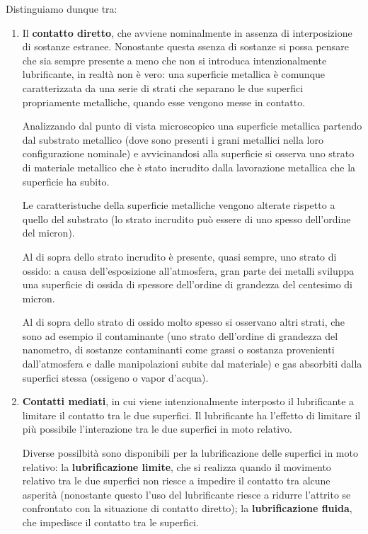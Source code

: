 Distinguiamo dunque tra:
\begin{enumerate}
\item Il \textbf{contatto diretto}, che avviene nominalmente in assenza di interposizione di sostanze estranee. Nonostante questa ssenza di sostanze si possa pensare che sia sempre presente a meno che non si introduca intenzionalmente lubrificante, in realtà non è vero: una superficie metallica è comunque caratterizzata da una serie di strati che separano le due superfici propriamente metalliche, quando esse vengono messe in contatto.

Analizzando dal punto di vista microscopico una superficie metallica partendo dal substrato metallico (dove sono presenti i grani metallici nella loro configurazione nominale) e avvicinandosi alla superficie si osserva uno strato di materiale metallico che è stato incrudito dalla lavorazione metallica che la superficie ha subito.

Le caratteristuche della superficie metalliche vengono alterate rispetto a quello del substrato (lo strato incrudito può essere di uno spesso dell'ordine del micron).

Al di sopra dello strato incrudito è presente, quasi sempre, uno strato di ossido: a causa dell'esposizione all'atmosfera, gran parte dei metalli sviluppa una superficie di ossida di spessore dell'ordine di grandezza del centesimo di micron.

Al di sopra dello strato di ossido molto spesso si osservano altri strati, che sono ad esempio il contaminante (uno strato dell'ordine di grandezza del nanometro, di sostanze contaminanti come grassi o sostanza provenienti dall'atmosfera e dalle manipolazioni subite dal materiale) e gas absorbiti dalla superfici stessa (ossigeno o vapor d'acqua).
\item \textbf{Contatti mediati}, in cui viene intenzionalmente interposto il lubrificante a limitare il contatto tra le due superfici. Il lubrificante ha l'effetto di limitare il più possibile l'interazione tra le due superfici in moto relativo.

Diverse possilbità sono disponibili per la lubrificazione delle superfici in moto relativo: la \textbf{lubrificazione limite}, che si realizza quando il movimento relativo tra le due superfici non riesce a impedire il contatto tra alcune asperità (nonostante questo l'uso del lubrificante riesce a ridurre l'attrito se confrontato con la situazione di contatto diretto); la \textbf{lubrificazione fluida}, che impedisce il contatto tra le superfici.


\end{enumerate}
